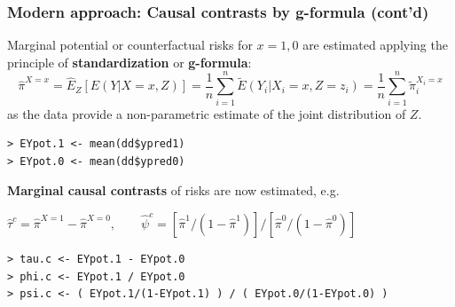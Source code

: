 \documentclass[12pt,dvipsnames,t,aspectratio=169, handout%
]{beamer}
\begin{document}
\begin{frame}[fragile]
\frametitle{\large Modern approach: Causal contrasts by g-formula (cont'd)}
\bi
\item
Marginal potential or counterfactual risks for $x=1,0$ are estimated applying
the principle of {\bf standardization} or {\bf g-formula}:
$$ \widehat{\pi}^{X=x} = \widehat{E}_Z[E(Y|X=x, Z)]  = \frac{1}{n} \sum_{i=1}^n \widetilde{E}(Y_i|X_i=x, Z=z_i) 
= \frac{1}{n} \sum_{i=1}^n \widetilde{\pi}_i^{X_i=x}
$$
as the data provide a non-parametric estimate of the joint distribution of $Z$.
\pause
{\small\color{blue}
\begin{verbatim}
> EYpot.1 <- mean(dd$ypred1)
> EYpot.0 <- mean(dd$ypred0)
\end{verbatim}
}
\medskip
\item
\textbf{Marginal causal contrasts} of risks are now estimated, e.g.
\begin{center}
$ \widehat\tau^c = \widehat{\pi}^{X=1} - \widehat{\pi}^{X=0}, \qquad 
	 \widehat\psi^c = [ \widehat{\pi}^{1}/(1-  \widehat{\pi}^{1})]/ [ \widehat{\pi}^{0}/(1- \widehat{\pi}^{0})] $
\end{center}
\medskip
{\small\color{blue}
\begin{verbatim}
> tau.c <- EYpot.1 - EYpot.0
> phi.c <- EYpot.1 / EYpot.0
> psi.c <- ( EYpot.1/(1-EYpot.1) ) / ( EYpot.0/(1-EYpot.0) )  
\end{verbatim}
}

\ei
\end{frame}
\end{document}
